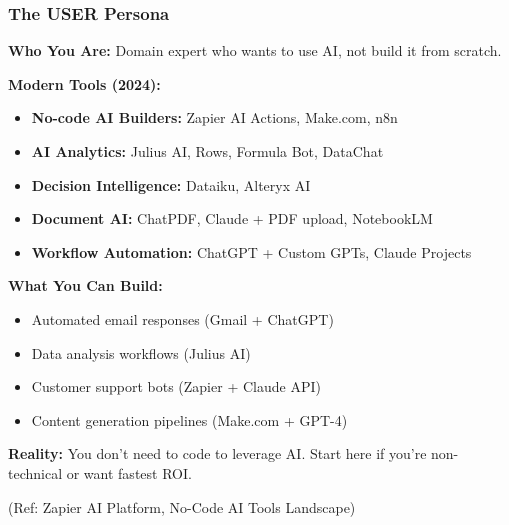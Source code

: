 \begin{frame}[fragile]\frametitle{The USER Persona}

\textbf{Who You Are:}
Domain expert who wants to use AI, not build it from scratch.

\textbf{Modern Tools (2024):}
\begin{itemize}
\item \textbf{No-code AI Builders:} Zapier AI Actions, Make.com, n8n
\item \textbf{AI Analytics:} Julius AI, Rows, Formula Bot, DataChat
\item \textbf{Decision Intelligence:} Dataiku, Alteryx AI
\item \textbf{Document AI:} ChatPDF, Claude + PDF upload, NotebookLM
\item \textbf{Workflow Automation:} ChatGPT + Custom GPTs, Claude Projects
\end{itemize}


\textbf{What You Can Build:}
\begin{itemize}
\item Automated email responses (Gmail + ChatGPT)
\item Data analysis workflows (Julius AI)
\item Customer support bots (Zapier + Claude API)
\item Content generation pipelines (Make.com + GPT-4)
\end{itemize}

\vspace{0.2cm}
\textbf{Reality:} You don't need to code to leverage AI. Start here if you're non-technical or want fastest ROI.

{\tiny (Ref: Zapier AI Platform, No-Code AI Tools Landscape)}
\end{frame}



